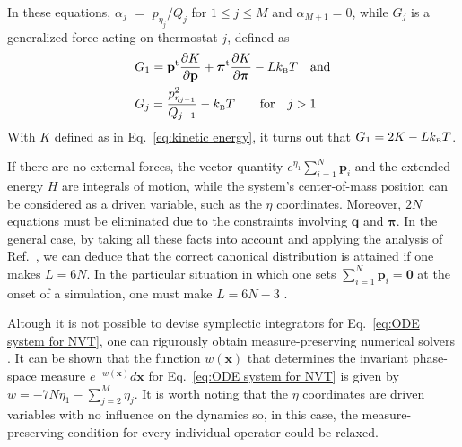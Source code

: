 \documentclass[
journal=jctcce,
layout=twocolumn
]{achemso}
\newcommand{\vt}[1]{\boldsymbol{\mathbf{#1}}}   %
\newcommand{\tr}[1]{#1^\text{t}}                %
\newcommand{\diff}[2]{\frac{\partial #1}{\partial #2}} %
\begin{document}
In these equations, $\alpha_j$ $=$ ${p_{\eta_j}}/{Q_j}$ for $1 \leq j \le M$ and $\alpha_{M+1} = 0$, while $G_j$ is a generalized force acting on thermostat $j$, defined as
\begin{subequations}
\begin{align}
\label{eq:generalized force NVT}
&G_1 = \tr{\vt p} \diff{K}{\vt p} + \tr{\vt \pi} \diff{K}{\vt \pi} - L k_\text{\tiny B} T \quad \text{and}\\
&G_j = \frac{p_{\eta_{j-1}}^2}{Q_{j-1}} - k_\text{\tiny B} T  \qquad \text{for} \quad j > 1.
\end{align}
\end{subequations}
With $K$ defined as in Eq.~\eqref{eq:kinetic energy}, it turns out that $G_1 = 2K - L k_\text{\tiny B} T$.

If there are no external forces, the vector quantity $e^{\eta_1}\sum_{i=1}^N {\vt p}_i$ and the extended energy $H$ are integrals of motion, while the system's center-of-mass position can be considered as a driven variable,\cite{Tuckerman_2001} such as the $\eta$ coordinates.
Moreover, $2N$ equations must be eliminated due to the constraints involving $\vt q$ and $\vt \pi$.
In the general case, by taking all these facts into account and applying the analysis of Ref.~, we can deduce that the correct canonical distribution is attained if one makes $L = 6N$.
In the particular situation in which one sets $\sum_{i=1}^N {\vt p}_i = \vt 0$ at the onset of a simulation, one must make $L = 6N - 3$ \cite{Martyna_1994}.

Altough it is not possible to devise symplectic integrators for Eq.~\eqref{eq:ODE system for NVT}, one can rigurously obtain measure-preserving numerical solvers \cite{Sergi_2001, Ezra_2004, Ezra_2006}.
It can be shown that the function $w(\vt x)$ that determines the invariant phase-space measure $e^{-w(\vt x)}d\vt x$ for Eq.~\ref{eq:ODE system for NVT} is given by $w = -7N \eta_1 - \sum_{j=2}^M \eta_j$.
It is worth noting that the $\eta$ coordinates are driven variables with no influence on the dynamics so, in this case, the measure-preserving condition for every individual operator could be relaxed.
\end{document}
